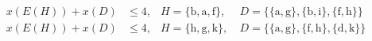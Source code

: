 \begin{align*}
x(E(H)) + x(D) &\leq 4, & H= \{\text{b},\text{a},\text{f}\},\ & D=\{\{\text{a},\text{g}\},\{\text{b},\text{i}\},\{\text{f},\text{h}\}\}\\
x(E(H)) + x(D) &\leq 4, & H= \{\text{h},\text{g},\text{k}\},\ & D=\{\{\text{a},\text{g}\},\{\text{f},\text{h}\},\{\text{d},\text{k}\}\}\\
\end{align*}
